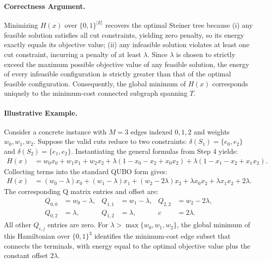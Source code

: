 \documentclass[12pt]{article}
\begin{document}
\paragraph{Correctness Argument.}
Minimizing $H(x)$ over $\{0,1\}^{|E|}$ recovers the optimal Steiner tree because (i) any feasible solution satisfies all cut constraints, yielding zero penalty, so its energy exactly equals its objective value; (ii) any infeasible solution violates at least one cut constraint, incurring a penalty of at least $\lambda$. Since $\lambda$ is chosen to strictly exceed the maximum possible objective value of any feasible solution, the energy of every infeasible configuration is strictly greater than that of the optimal feasible configuration. Consequently, the global minimum of $H(x)$ corresponds uniquely to the minimum-cost connected subgraph spanning $T$.

\paragraph{Illustrative Example.}
Consider a concrete instance with $M=3$ edges indexed $0, 1, 2$ and weights $w_0, w_1, w_2$. Suppose the valid cuts reduce to two constraints: $\delta(S_1) = \{e_0, e_2\}$ and $\delta(S_2) = \{e_1, e_2\}$. Instantiating the general formulas from Step 4 yields:
\begin{align}
H(x) &= w_0 x_0 + w_1 x_1 + w_2 x_2 + \lambda \left( 1 - x_0 - x_2 + x_0 x_2 \right) + \lambda \left( 1 - x_1 - x_2 + x_1 x_2 \right).
\end{align}
Collecting terms into the standard QUBO form gives:
\begin{align}
H(x) &= (w_0 - \lambda)x_0 + (w_1 - \lambda)x_1 + (w_2 - 2\lambda)x_2 + \lambda x_0 x_2 + \lambda x_1 x_2 + 2\lambda.
\end{align}
The corresponding Q matrix entries and offset are:
\begin{align}
Q_{0,0} &= w_0 - \lambda, & Q_{1,1} &= w_1 - \lambda, & Q_{2,2} &= w_2 - 2\lambda, \\
Q_{0,2} &= \lambda, & Q_{1,2} &= \lambda, & c &= 2\lambda.
\end{align}
All other $Q_{i,j}$ entries are zero. For $\lambda > \max\{w_0, w_1, w_2\}$, the global minimum of this Hamiltonian over $\{0,1\}^3$ identifies the minimum-cost edge subset that connects the terminals, with energy equal to the optimal objective value plus the constant offset $2\lambda$.
\end{document}
